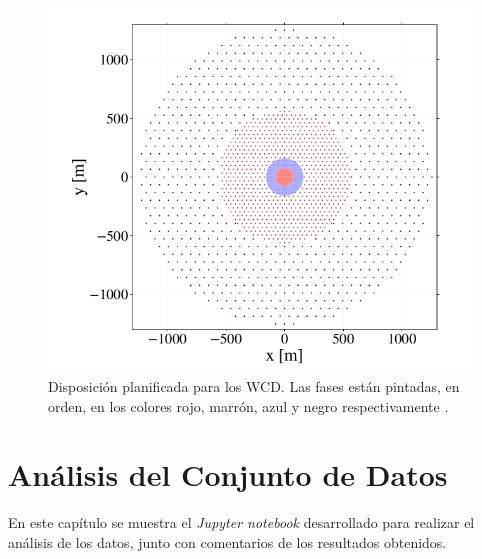 \begin{figure}[H]
	\includegraphics[width=1.\linewidth]{imagenes/01_Introduccion/layout.png}
	\centering
	\caption{Disposición planificada para los WCD. Las fases están pintadas, en orden, en los colores rojo, marrón, azul y negro respectivamente \cite{hapnote}.}
	\label{fig:wcdschema}
\end{figure}

\section{Análisis del Conjunto de Datos}\label{chap:datanalysis}

En este capítulo se muestra el \textit{Jupyter notebook} desarrollado para realizar el análisis de los datos, junto con comentarios de los resultados obtenidos.


